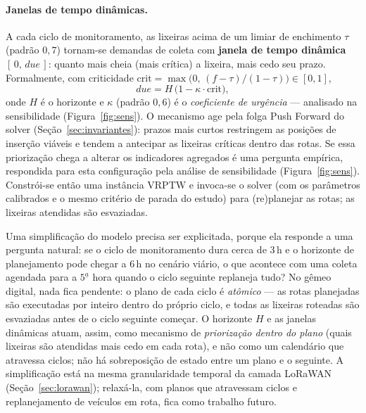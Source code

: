 \documentclass[12pt, a4paper]{article}
\begin{document}
\paragraph{Janelas de tempo dinâmicas.} A cada ciclo de monitoramento, as lixeiras acima de um limiar de enchimento $\tau$ (padrão $0{,}7$) tornam-se demandas de coleta com \textbf{janela de tempo dinâmica} $[\,0,\,\mathit{due}\,]$: quanto mais cheia (mais crítica) a lixeira, mais cedo seu prazo. Formalmente, com criticidade $\mathrm{crit}=\max\!\big(0,\,(f-\tau)/(1-\tau)\big)\in[0,1]$,
\begin{equation}
\mathit{due}=H\,\big(1-\kappa\cdot\mathrm{crit}\big),
\end{equation}
onde $H$ é o horizonte e $\kappa$ (padrão $0{,}6$) é o \emph{coeficiente de urgência} --- analisado na sensibilidade (Figura~\ref{fig:sens}). O mecanismo age pela folga Push Forward do solver (Seção~\ref{sec:invariantes}): prazos mais curtos restringem as posições de inserção viáveis e tendem a antecipar as lixeiras críticas dentro das rotas. Se essa priorização chega a alterar os indicadores agregados é uma pergunta empírica, respondida para esta configuração pela análise de sensibilidade (Figura~\ref{fig:sens}). Constrói-se então uma instância VRPTW e invoca-se o solver (com os parâmetros calibrados e o mesmo critério de parada do estudo) para (re)planejar as rotas; as lixeiras atendidas são esvaziadas.

Uma simplificação do modelo precisa ser explicitada, porque ela responde a uma pergunta natural: se o ciclo de monitoramento dura cerca de $3$\,h e o horizonte de planejamento pode chegar a $6$\,h no cenário viário, o que acontece com uma coleta agendada para a $5^{\underline{a}}$ hora quando o ciclo seguinte replaneja tudo? No gêmeo digital, nada fica pendente: o plano de cada ciclo é \emph{atômico} --- as rotas planejadas são executadas por inteiro dentro do próprio ciclo, e todas as lixeiras roteadas são esvaziadas antes de o ciclo seguinte começar. O horizonte $H$ e as janelas dinâmicas atuam, assim, como mecanismo de \emph{priorização dentro do plano} (quais lixeiras são atendidas mais cedo em cada rota), e não como um calendário que atravessa ciclos; não há sobreposição de estado entre um plano e o seguinte. A simplificação está na mesma granularidade temporal da camada LoRaWAN (Seção~\ref{sec:lorawan}); relaxá-la, com planos que atravessam ciclos e replanejamento de veículos em rota, fica como trabalho futuro.
\end{document}
